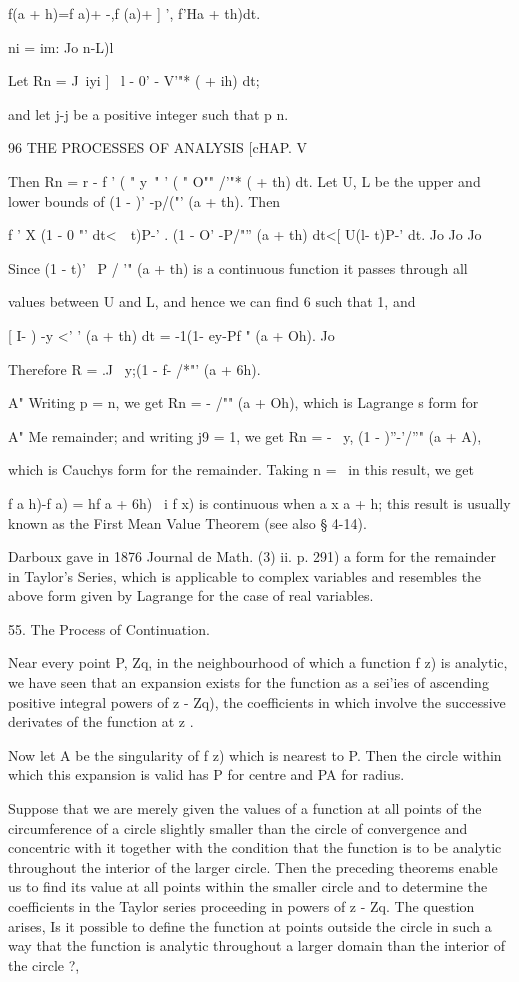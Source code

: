 {{f(a + h)=f a)+ -,f (a)+ ] ', f'Ha + th)dt.

ni = im: Jo n-L)l

Let Rn = J~iyi ] \ l - 0' - V'"* ( + ih) dt;

and let j-j be a positive integer such that p n.

96 THE PROCESSES OF ANALYSIS [cHAP. V

Then Rn = r - f ' ( " y~" ' ( " O"" /'"* ( + th) dt. Let U, L be the
upper and lower bounds of (1 - )' -p/("' (a + th). Then

f ' X (1 - 0 "' dt<\ \ t)P-' . (1 - O' -P/"'' (a + th) dt<[ U(l- t)P-'
dt. Jo Jo Jo

Since (1 - t)' ~P / '" (a + th) is a continuous function it passes
through all

values between U and L, and hence we can find 6 such that 1, and

[ I- ) -y <' ' (a + th) dt = -1(1- ey-Pf " (a + Oh). Jo

Therefore R = .J \ y;(1 - f- /*"' (a + 6h).

A" Writing p = n, we get Rn = - /"" (a + Oh), which is Lagrange s form
for

A" Me remainder; and writing j9 = 1, we get Rn = - \, y, (1 -
)''-'/''" (a + A),

which is Cauchys form for the remainder. Taking n = \ in this result,
we get

f a h)-f a) = hf a + 6h) \ i f x) is continuous when a x a + h; this
result is usually known as the First Mean Value Theorem (see also §
4-14).

Darboux gave in 1876 Journal de Math. (3) ii. p. 291) a form for the
remainder in Taylor's Series, which is applicable to complex variables
and resembles the above form given by Lagrange for the case of real
variables.

55. The Process of Continuation.

Near every point P, Zq, in the neighbourhood of which a function f z)
is analytic, we have seen that an expansion exists for the function as
a sei'ies of ascending positive integral powers of z - Zq), the
coefficients in which involve the successive derivates of the function
at z .

Now let A be the singularity of f z) which is nearest to P. Then the
circle within which this expansion is valid has P for centre and PA
for radius.

Suppose that we are merely given the values of a function at all
points of the circumference of a circle slightly smaller than the
circle of convergence and concentric with it together with the
condition that the function is to be analytic throughout the interior
of the larger circle. Then the preceding theorems enable us to find
its value at all points within the smaller circle and to determine the
coefficients in the Taylor series proceeding in powers of z - Zq. The
question arises, Is it possible to define the function at points
outside the circle in such a way that the function is analytic
throughout a larger domain than the interior of the circle ?,

}}

